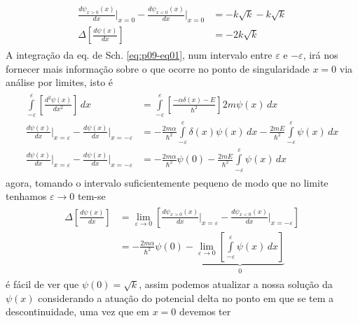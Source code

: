 \begin{prob}
\begin{sol}
\begin{enumerate}[label=\alph *)]
\begin{align}
\begin{split}
								\frac{d \psi_{x>0}(x)}{dx}\Bigg|_{x=0}-\frac{d \psi_{x<0}(x)}{dx}\Bigg|_{x=0} &= -k\sqrt{k}-k\sqrt{k}\\
								\Delta \left[\frac{d \psi(x)}{dx}\right] &= -2k\sqrt{k} \label{eq:p09-02}
							\end{split}
					\end{align}
					A integração da eq. de Sch. \eqref{eq:p09-eq01}, num intervalo entre $\varepsilon$ e $-\varepsilon$, irá nos fornecer mais informação sobre o que ocorre no ponto de singularidade $x=0$ via análise por limites, isto é
					\begin{align}
						\begin{split}
							\int\limits_{-\varepsilon}^{\varepsilon}\left[\frac{d^{2} \psi(x)}{dx^{2}}\right]\,d{x} &= \int\limits_{-\varepsilon}^{\varepsilon}\left[\frac{-\alpha \delta(x)-E}{\hbar^{2}}\right]2m \psi(x)\,d{x}\\
							\frac{d \psi(x)}{dx}\Bigg|_{x=\varepsilon}-\frac{d \psi(x)}{dx}\Bigg|_{x=-\varepsilon} &= -\frac{2m \alpha}{\hbar^{2}}\int\limits_{-\varepsilon}^{\varepsilon} \delta(x) \psi(x)\,d{x}-\frac{2mE}{\hbar^{2}}\int\limits_{-\varepsilon}^{\varepsilon} \psi(x)\,d{x}\\
							\frac{d \psi(x)}{dx}\Bigg|_{x=\varepsilon}-\frac{d \psi(x)}{dx}\Bigg|_{x=-\varepsilon} &= -\frac{2m \alpha}{\hbar^{2}} \psi(0)-\frac{2mE}{\hbar^{2}}\int\limits_{-\varepsilon}^{\varepsilon} \psi(x)\,d{x}
						\end{split}
					\end{align}
					agora, tomando o intervalo suficientemente pequeno de modo que no limite tenhamos $\varepsilon\to 0$ tem-se
					\begin{align}
							\begin{split}
								\Delta \left[\frac{d \psi(x)}{dx}\right] &= \lim_{\varepsilon\to 0}{\left[\frac{d \psi_{x>0}(x)}{dx}\Bigg|_{x=\varepsilon}-\frac{d \psi_{x<0}(x)}{dx}\Bigg|_{x=-\varepsilon}\right]}\\
																												 &= -\frac{2m \alpha}{\hbar^{2}} \psi(0)-\underbrace{\lim_{\varepsilon\to 0}\left[\int\limits_{-\varepsilon}^{\varepsilon} \psi(x)\,d{x}\right]}_{0}
							\end{split}
					\end{align}
					é fácil de ver que $\psi(0)=\sqrt{k}$, assim podemos atualizar a nossa solução da $\psi(x)$ considerando a atuação do potencial delta no ponto em que se tem a descontinuidade, uma vez que em $x=0$ devemos ter
					\begin{align}

\end{align}
\end{enumerate}
\end{sol}
\end{prob}

